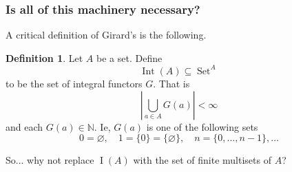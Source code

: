 \documentclass{beamer}
\theoremstyle{plain}
\theoremstyle{definition}
\newtheorem{defn}[thm]{Definition} %
\newcommand{\bb}[1]{\mathbb{#1}}
\DeclareMathOperator{\set}{Set}
\begin{document}
\begin{frame}
\frametitle{Is all of this machinery necessary?}
A critical definition of Girard's is the following.
\begin{defn}
Let $A$ be a set. Define
\begin{equation*}
\operatorname{Int}(A) \subseteq \set^A
\end{equation*}
to be the set of integral functors $G$. That is
\begin{equation*}
|\bigcup_{a \in A}G(a)| < \infty
\end{equation*}
and each $G(a) \in \bb{N}$. Ie, $G(a)$ is one of the following sets
\begin{equation*}
0 = \varnothing,\quad 1 = \{ 0 \} = \{ \varnothing \},\quad n = \{ 0, \ldots, n-1 \}, \ldots
\end{equation*}
\end{defn}
So... why not replace $\operatorname{I}(A)$ with the set of finite multisets of $A$?
\end{frame}
\end{document}
